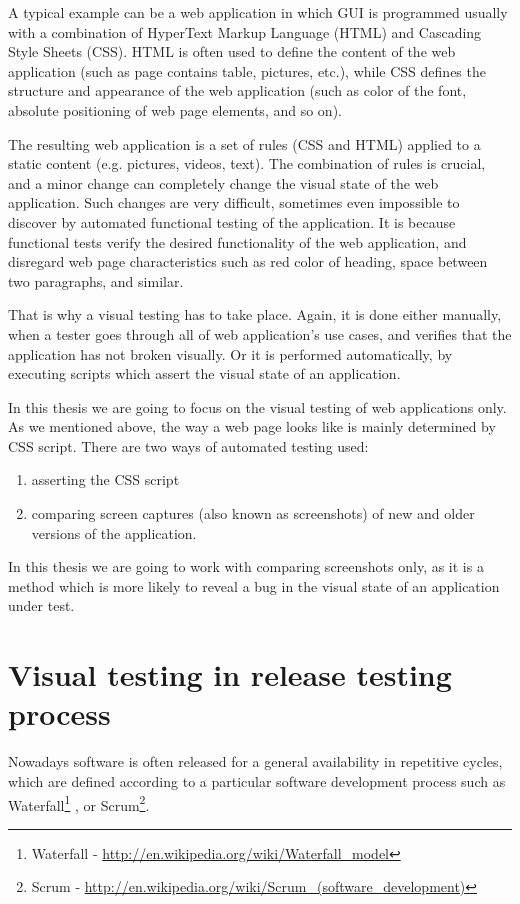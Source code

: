 \documentclass[11pt,oneside,final]{fithesis2}
\begin{document}
    A typical example can be a web application in which GUI is programmed usually with a combination of HyperText Markup Language (HTML) and Cascading Style Sheets (CSS). 
    HTML is often used to define the content of the web application (such as page contains table, pictures, etc.), while CSS defines the structure and appearance of the 
    web application (such as color of the font, absolute positioning of web page elements, and so on).
    
    The resulting web application is a set of rules (CSS and HTML) applied to a static content (e.g. pictures, videos, text). The combination of rules is crucial, and a minor change
    can completely change the visual state of the web application. Such changes are very difficult, sometimes even impossible to discover by automated functional testing of the application. 
    It is because functional tests verify the desired functionality of the web application, and disregard web page characteristics such as red color of heading, 
    space between two paragraphs, and similar.
    
    That is why a visual testing has to take place. Again, it is done either manually, when a tester goes through all of web application's use cases, and verifies that
    the application has not broken visually. Or it is performed automatically, by executing scripts which assert the visual state of an application.
    
    In this thesis we are going to focus on the visual testing of web applications only. As we mentioned above, the way a web page looks like is mainly determined by CSS script.
    There are two ways of automated testing used:
    \begin{enumerate}
      \item asserting the CSS script
      \item comparing screen captures (also known as screenshots) of new and older versions of the application.
    \end{enumerate}
    
    In this thesis we are going to work with comparing screenshots only, as it is a method which is more likely to reveal a bug
    in the visual state of an application under test.
     
  \section{Visual testing in release testing process}
  \label{sec:visual-testing-in-release-process}
  Nowadays software is often released for a general availability in repetitive cycles, which are defined according to a particular software development process
  such as Waterfall\footnote{Waterfall - \url{http://en.wikipedia.org/wiki/Waterfall_model}} , or Scrum\footnote{Scrum - \url{http://en.wikipedia.org/wiki/Scrum_(software_development)}}.
  
\end{document}
